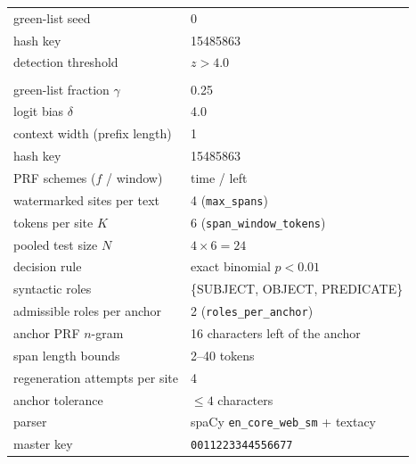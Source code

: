 \begin{table}[t]
\begin{tabular}{@{}ll@{}}
\quad green-list seed                    & 0 \\
\quad hash key                           & 15485863 \\
\quad detection threshold                & $z > 4.0$ \\
\addlinespace
\multicolumn{2}{@{}l}{\textit{SpanWM}} \\
\quad green-list fraction $\gamma$       & 0.25 \\
\quad logit bias $\delta$                & 4.0 \\
\quad context width (prefix length)      & 1 \\
\quad hash key                           & 15485863 \\
\quad PRF schemes ($f$ / window)         & time / left \\
\quad watermarked sites per text         & 4 (\texttt{max\_spans}) \\
\quad tokens per site $K$                & 6 (\texttt{span\_window\_tokens}) \\
\quad pooled test size $N$               & $4 \times 6 = 24$ \\
\quad decision rule                      & exact binomial $p < 0.01$ \\
\quad syntactic roles                    & \{SUBJECT, OBJECT, PREDICATE\} \\
\quad admissible roles per anchor         & 2 (\texttt{roles\_per\_anchor}) \\
\quad anchor PRF $n$-gram                & 16 characters left of the anchor \\
\quad span length bounds                 & 2--40 tokens \\
\quad regeneration attempts per site     & 4 \\
\quad anchor tolerance                   & $\le 4$ characters \\
\quad parser                             & spaCy \texttt{en\_core\_web\_sm} + textacy \\
\quad master key                         & \texttt{0011223344556677} \\
\bottomrule
\end{tabular}
\end{table}
